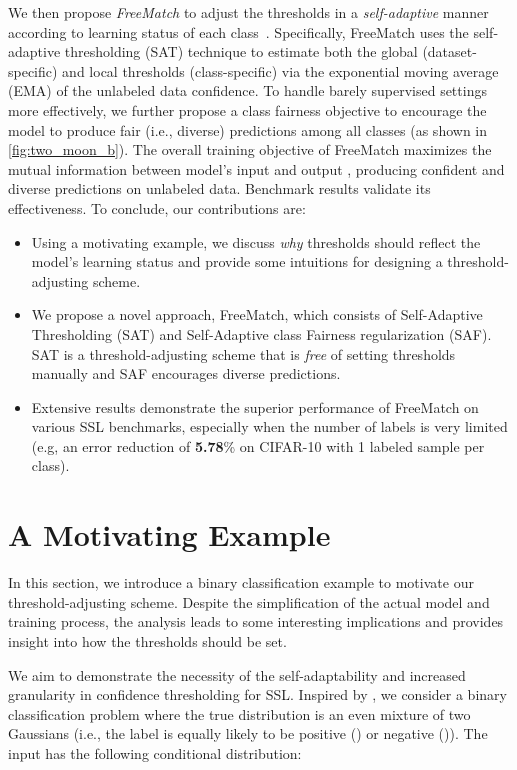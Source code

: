 \documentclass{article} \usepackage{iclr2023_conference,times}
\theoremstyle{plain}
\theoremstyle{definition}
\theoremstyle{remark}
\newcommand{\ourmethod}{FreeMatch\xspace}
\begin{document}
We then propose \emph{\ourmethod} to adjust the thresholds in a \emph{self-adaptive} manner according to learning status of each class~\citep{guo2017calibration}.
Specifically, \ourmethod uses the self-adaptive thresholding (SAT) technique to estimate both the global (dataset-specific) and local thresholds (class-specific) via the exponential moving average (EMA) of the unlabeled data confidence.
To handle barely supervised settings \citep{sohn2020fixmatch} more effectively, we further propose a class fairness objective to encourage the model to produce fair (i.e., diverse) predictions among all classes (as shown in \cref{fig:two_moon_b}).
The overall training objective of \ourmethod maximizes the mutual information between model's input and output \citep{bridle1991unsup}, producing confident and diverse predictions on unlabeled data.
Benchmark results validate its effectiveness.
To conclude, our contributions are:
\begin{itemize}
\item Using a motivating example, we discuss \emph{why} thresholds should reflect the model's learning status and provide some intuitions for designing a threshold-adjusting scheme.
    \item We propose a novel approach, \ourmethod, which consists of Self-Adaptive Thresholding (SAT) and Self-Adaptive class Fairness regularization (SAF). SAT is a threshold-adjusting scheme that is \emph{free} of setting thresholds manually and SAF encourages diverse predictions. 
    \item Extensive results demonstrate the superior performance of \ourmethod on various SSL benchmarks, especially when the number of labels is very limited (e.g, an error reduction of \textbf{5.78}\% on CIFAR-10 with 1 labeled sample per class).
\end{itemize}





\section{A Motivating Example}
\label{seq:theory}
In this section, we introduce a binary classification example to motivate our threshold-adjusting scheme. Despite the simplification of the actual model and training process, the analysis leads to some interesting implications and provides insight into how the thresholds should be set. 

We aim to demonstrate the necessity of the self-adaptability and increased granularity in confidence thresholding for SSL.
Inspired by \citep{yang2020rethinking}, we consider a binary classification problem where the true distribution is an even mixture of two Gaussians (i.e., the label  is equally likely to be positive () or negative ()). The input  has the following conditional distribution:
\end{document}
